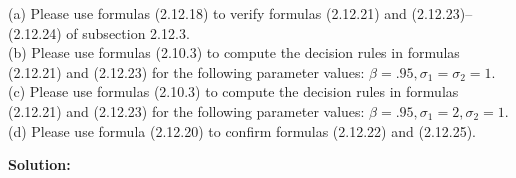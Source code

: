 \documentclass[12pt, letterpaper]{article}
\begin{document}
\begin{tcolorbox}[oddbox,title={Exercise 2.25 \quad Consumption: the Two Classic Examples}]
\begin{tcolorbox}[questionbox]
(a) Please use formulas (2.12.18) to verify formulas (2.12.21) and (2.12.23)--(2.12.24) of subsection
2.12.3.\\
(b) Please use formulas (2.10.3) to compute the decision rules in formulas (2.12.21) and (2.12.23)
for the following parameter values: $\beta=.95,\sigma_1=\sigma_2=1$.\\
(c) Please use formulas (2.10.3) to compute the decision rules in formulas (2.12.21) and (2.12.23)
for the following parameter values: $\beta=.95,\sigma_1=2,\sigma_2=1$.\\
(d) Please use formula (2.12.20) to confirm formulas (2.12.22) and (2.12.25).
\end{tcolorbox}

\textbf{Solution:}


\end{tcolorbox}
\end{document}

